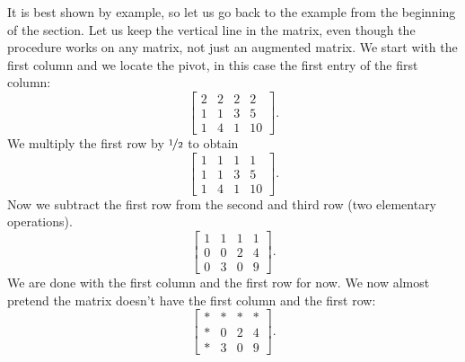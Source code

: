 It is best shown by example, so let us go back to the 
example from the beginning of the section.
Let us keep the vertical line in the matrix,
even though the procedure works on any matrix, not just
an augmented matrix.
We start with the first column and we locate the pivot, in this
case the first entry of the first column:
\begin{equation*}
\left[
\begin{array}{ccc|c}
\boxed{2} & 2 & 2 & 2 \\
1 & 1 & 3 & 5 \\
1 & 4 & 1 & 10
\end{array}
\right] .
\end{equation*}
We multiply the first row by
$\nicefrac{1}{2}$ to obtain
\begin{equation*}
\left[
\begin{array}{ccc|c}
\boxed{1} & 1 & 1 & 1 \\
1 & 1 & 3 & 5 \\
1 & 4 & 1 & 10
\end{array}
\right] .
\end{equation*}
Now we subtract the first row from the second and third row (two elementary
operations).
\begin{equation*}
\left[
\begin{array}{ccc|c}
1 & 1 & 1 & 1 \\
0 & 0 & 2 & 4 \\
0 & 3 & 0 & 9
\end{array}
\right] .
\end{equation*}
We are done with the first column and the first row for now.  We now almost
pretend the matrix doesn't have the first column and the first row:
\begin{equation*}
\left[
\begin{array}{ccc|c}
* & * & * & * \\
* & 0 & 2 & 4 \\
* & 3 & 0 & 9
\end{array}
\right] .
\end{equation*}

